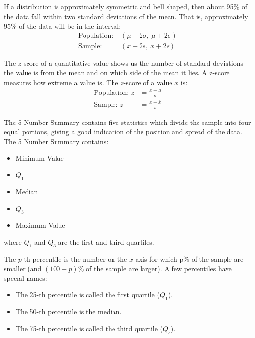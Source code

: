\documentclass[12pt]{article}
\begin{document}
\begin{tcolorbox}[title=95\% Rule]
    If a distribution is approximately symmetric and bell shaped, then about 95\% of the data fall within two standard deviations of the mean. That is, approximately 95\% of the data will be in the interval:
    \begin{align*}
        \text{Population: }&(\mu - 2\sigma,\ \mu + 2\sigma)\\
        \text{Sample: }&(\bar{x} - 2s,\ \bar{x} + 2s)
    \end{align*}
\end{tcolorbox}

\begin{tcolorbox}[title=$z$-Score]
    The $z$-score of a quantitative value shows us the number of standard deviations the value is from the mean and on which side of the mean it lies. A z-score measures how extreme a value is. The $z$-score of a value $x$ is:
    \begin{align*}
        \text{Population: }z&=\frac{x-\mu}{\sigma}\\
        \text{Sample: }z&=\frac{x-\bar{x}}{s}
    \end{align*}
\end{tcolorbox}

\begin{tcolorbox}[title=5 Number Summary]
    The 5 Number Summary contains five statistics which divide the sample into four equal portions, giving a good indication of the position and spread of the data. The 5 Number Summary contains:
    \begin{itemize}
        \item Minimum Value
        \item $Q_1$
        \item Median
        \item $Q_3$
        \item Maximum Value
    \end{itemize}
    where $Q_1$ and $Q_3$ are the first and third quartiles.
    \begin{tcolorbox}[title=Percentiles \& Quartiles]
        The $p$-th percentile is the number on the $x$-axis for which p\% of the sample are smaller (and $(100 - p)\%$ of the sample are larger). A few percentiles have special names:
        \begin{itemize}
            \item The 25-th percentile is called the first quartile ($Q_1$).
            \item The 50-th percentile is the median.
            \item The 75-th percentile is called the third quartile ($Q_3$).
        \end{itemize}
    \end{tcolorbox}
\end{tcolorbox}
\end{document}
